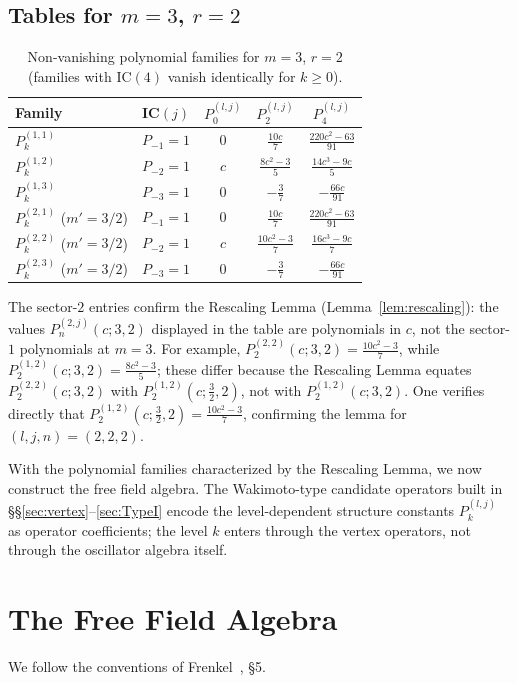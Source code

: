 \documentclass[12pt]{article}
\theoremstyle{plain}
\theoremstyle{definition}
\theoremstyle{remark}
\newcommand{\Plk}[2]{P^{(#1)}_{#2}}
\begin{document}
\subsection{Tables for \texorpdfstring{$m=3$, $r=2$}{m=3, r=2}}
\begin{table}[h]\centering
\caption{Non-vanishing polynomial families for $m=3$, $r=2$ (families with IC$(4)$ vanish identically for $k\geq 0$).}\label{tab:polys}
\renewcommand{\arraystretch}{1.4}
\begin{tabular}{@{}lcccc@{}}
\toprule
Family & IC$(j)$ & $P^{(l,j)}_0$ & $P^{(l,j)}_2$ & $P^{(l,j)}_4$ \\
\midrule
$\Plk{1,1}{k}$ & $P_{-1}=1$ & $0$ & $\frac{10c}{7}$ & $\frac{220c^2-63}{91}$ \\[3pt]
$\Plk{1,2}{k}$ & $P_{-2}=1$ & $c$ & $\frac{8c^2-3}{5}$ & $\frac{14c^3-9c}{5}$ \\[3pt]
$\Plk{1,3}{k}$ & $P_{-3}=1$ & $0$ & $-\tfrac{3}{7}$ & $-\tfrac{66c}{91}$ \\[3pt]
$\Plk{2,1}{k}$ ($m'=3/2$) & $P_{-1}=1$ & $0$ & $\frac{10c}{7}$ & $\frac{220c^2-63}{91}$ \\[3pt]
$\Plk{2,2}{k}$ ($m'=3/2$) & $P_{-2}=1$ & $c$ & $\frac{10c^2-3}{7}$ & $\frac{16c^3-9c}{7}$ \\[3pt]
$\Plk{2,3}{k}$ ($m'=3/2$) & $P_{-3}=1$ & $0$ & $-\tfrac{3}{7}$ & $-\tfrac{66c}{91}$ \\
\bottomrule
\end{tabular}
\end{table}
The sector-$2$ entries confirm the Rescaling Lemma
(Lemma~\ref{lem:rescaling}): the values $\Plk{2,j}{n}(c;3,2)$ displayed
in the table are polynomials in $c$, not the sector-$1$ polynomials at $m=3$.
For example, $\Plk{2,2}{2}(c;3,2)=\tfrac{10c^2-3}{7}$, while
$\Plk{1,2}{2}(c;3,2)=\tfrac{8c^2-3}{5}$; these differ because the Rescaling
Lemma equates $\Plk{2,2}{2}(c;3,2)$ with $\Plk{1,2}{2}(c;\tfrac{3}{2},2)$,
not with $\Plk{1,2}{2}(c;3,2)$.
One verifies directly that $\Plk{1,2}{2}(c;\tfrac{3}{2},2)=\tfrac{10c^2-3}{7}$,
confirming the lemma for $(l,j,n)=(2,2,2)$.

With the polynomial families characterized by the Rescaling Lemma, we now
construct the free field algebra.
The Wakimoto-type candidate operators built in \S\S\ref{sec:vertex}--\ref{sec:TypeI} encode
the level-dependent structure constants $\Plk{l,j}{k}$ as operator coefficients;
the level $k$ enters through the vertex operators, not through the oscillator
algebra itself.
\section{The Free Field Algebra}\label{sec:ffa}
We follow the conventions of Frenkel~\cite{Frenkel2005}, \S5.
\end{document}
